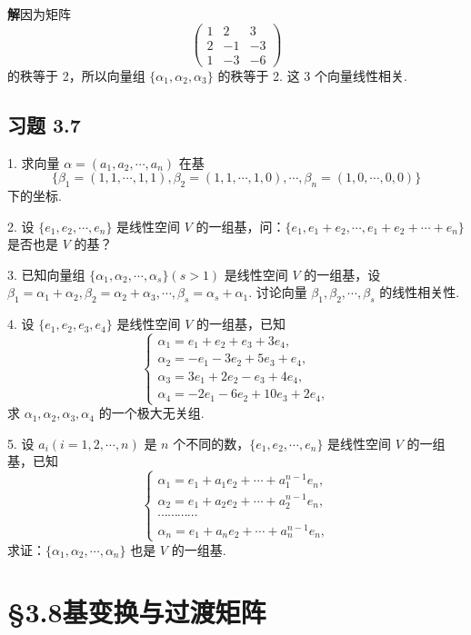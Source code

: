 \documentclass[UTF8,12pt,a4paper,fontset=fandol]{ctexart}
\begin{document}
\noindent\textbf{解}\quad 因为矩阵
\[
\left(\begin{array}{rrr}
1&2&3\\
2&-1&-3\\
1&-3&-6
\end{array}\right)
\]
的秩等于 2，所以向量组 $\{\alpha_1,\alpha_2,\alpha_3\}$ 的秩等于 2. 这 3 个向量线性相关.

\subsection*{习题 3.7}

1. 求向量 $\alpha=(a_1,a_2,\cdots,a_n)$ 在基
\[
\{\beta_1=(1,1,\cdots,1,1),\beta_2=(1,1,\cdots,1,0),\cdots,\beta_n=(1,0,\cdots,0,0)\}
\]
下的坐标.

2. 设 $\{e_1,e_2,\cdots,e_n\}$ 是线性空间 $V$ 的一组基，问：$\{e_1,e_1+e_2,\cdots,e_1+e_2+\cdots+e_n\}$ 是否也是 $V$ 的基？

3. 已知向量组 $\{\alpha_1,\alpha_2,\cdots,\alpha_s\}(s>1)$ 是线性空间 $V$ 的一组基，设 $\beta_1=\alpha_1+\alpha_2,\beta_2=\alpha_2+\alpha_3,\cdots,\beta_s=\alpha_s+\alpha_1$. 讨论向量 $\beta_1,\beta_2,\cdots,\beta_s$ 的线性相关性.

4. 设 $\{e_1,e_2,e_3,e_4\}$ 是线性空间 $V$ 的一组基，已知
\[
\left\{\begin{array}{l}
\alpha_1=e_1+e_2+e_3+3e_4,\\
\alpha_2=-e_1-3e_2+5e_3+e_4,\\
\alpha_3=3e_1+2e_2-e_3+4e_4,\\
\alpha_4=-2e_1-6e_2+10e_3+2e_4,
\end{array}\right.
\]
求 $\alpha_1,\alpha_2,\alpha_3,\alpha_4$ 的一个极大无关组.

5. 设 $a_i(i=1,2,\cdots,n)$ 是 $n$ 个不同的数，$\{e_1,e_2,\cdots,e_n\}$ 是线性空间 $V$ 的一组基，已知
\[
\left\{\begin{array}{l}
\alpha_1=e_1+a_1e_2+\cdots+a_1^{n-1}e_n,\\
\alpha_2=e_1+a_2e_2+\cdots+a_2^{n-1}e_n,\\
\cdots\cdots\cdots\cdots\\
\alpha_n=e_1+a_ne_2+\cdots+a_n^{n-1}e_n,
\end{array}\right.
\]
求证：$\{\alpha_1,\alpha_2,\cdots,\alpha_n\}$ 也是 $V$ 的一组基.

\section*{§3.8\quad 基变换与过渡矩阵}
\end{document}
